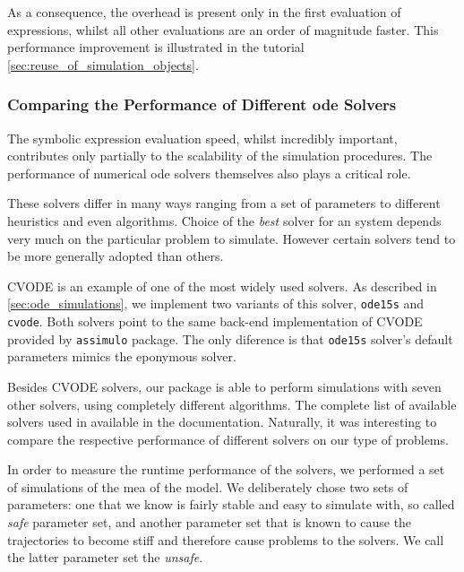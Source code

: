 As a consequence, the overhead is present only in the first evaluation of expressions, whilst all other evaluations are an order of magnitude faster.
This performance improvement is illustrated in the tutorial \autoref{sec:reuse_of_simulation_objects}.

\subsubsection{Comparing the Performance of Different \gls{ode} Solvers}

The symbolic expression evaluation speed, whilst incredibly important, contributes only partially to the scalability of the simulation procedures.
The performance of numerical \gls{ode} solvers themselves also plays a critical role.

These solvers differ in many ways ranging from a set of parameters to different heuristics and even algorithms.
Choice of the \emph{best} solver for an  system depends very much on the particular problem to simulate.
However certain solvers tend to be more generally adopted than others\cite{andersson_workbench_2012}.

CVODE is an example of one of the most widely used solvers.
As described in \autoref{sec:ode_simulations}, we implement two variants of this solver, \verb#ode15s# and \verb#cvode#.
Both solvers point to the same back-end implementation of CVODE provided by \verb#assimulo# package.
The only diference is that \verb#ode15s# solver's default parameters mimics the eponymous \mat{} solver.

Besides CVODE solvers, our package is able to perform simulations with seven other solvers, using completely different algorithms.
The complete list of available solvers used in available in the documentation.
Naturally, it was interesting to compare the respective performance of different solvers on our type of problems.

In order to measure the runtime performance of the solvers, we performed a set of simulations of the \acrlong{mea} of the \pft{} model.
We deliberately chose two sets of parameters: one that we know is fairly stable and easy to simulate with, so called \emph{safe} parameter set,
and another parameter set that is known to cause the trajectories to become stiff and therefore cause problems to the solvers.
We call the latter parameter set the \emph{unsafe}.
 
